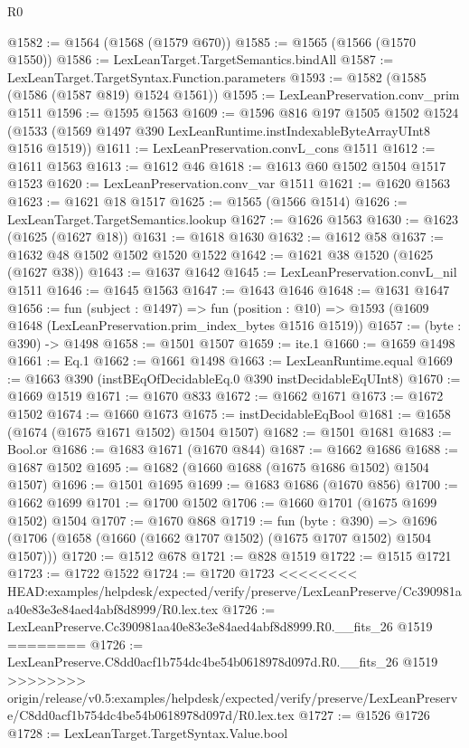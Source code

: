 \begin{lexlean}{R0}
\begin{coremodule}
{{{{{{{{{{{{{{{{{{{{{{{{{{{{{{{{{{{{{{{{{{{{{{{{{{{{{{{{{{{{{{{{{{{{{{{{{@1582 := @1564 (@1568 (@1579 @670))
@1585 := @1565 (@1566 (@1570 @1550))
@1586 := LexLeanTarget.TargetSemantics.bindAll
@1587 := LexLeanTarget.TargetSyntax.Function.parameters
@1593 := @1582 (@1585 (@1586 (@1587 @819) @1524 @1561))
@1595 := LexLeanPreservation.conv_prim @1511
@1596 := @1595 @1563
@1609 := @1596
    @816
    @197
    @1505
    @1502
    @1524
    (@1533 (@1569 @1497 @390 LexLeanRuntime.instIndexableByteArrayUInt8 @1516 @1519))
@1611 := LexLeanPreservation.convL_cons @1511
@1612 := @1611 @1563
@1613 := @1612 @46
@1618 := @1613 @60 @1502 @1504 @1517 @1523
@1620 := LexLeanPreservation.conv_var @1511
@1621 := @1620 @1563
@1623 := @1621 @18 @1517
@1625 := @1565 (@1566 @1514)
@1626 := LexLeanTarget.TargetSemantics.lookup
@1627 := @1626 @1563
@1630 := @1623 (@1625 (@1627 @18))
@1631 := @1618 @1630
@1632 := @1612 @58
@1637 := @1632 @48 @1502 @1502 @1520 @1522
@1642 := @1621 @38 @1520 (@1625 (@1627 @38))
@1643 := @1637 @1642
@1645 := LexLeanPreservation.convL_nil @1511
@1646 := @1645 @1563
@1647 := @1643 @1646
@1648 := @1631 @1647
@1656 := fun (subject : @1497) =>
  fun (position : @10) => @1593 (@1609 @1648 (LexLeanPreservation.prim_index_bytes @1516 @1519))
@1657 := (byte : @390) -> @1498
@1658 := @1501 @1507
@1659 := ite.{1}
@1660 := @1659 @1498
@1661 := Eq.{1}
@1662 := @1661 @1498
@1663 := LexLeanRuntime.equal
@1669 := @1663 @390 (instBEqOfDecidableEq.{0} @390 instDecidableEqUInt8)
@1670 := @1669 @1519
@1671 := @1670 @833
@1672 := @1662 @1671
@1673 := @1672 @1502
@1674 := @1660 @1673
@1675 := instDecidableEqBool
@1681 := @1658 (@1674 (@1675 @1671 @1502) @1504 @1507)
@1682 := @1501 @1681
@1683 := Bool.or
@1686 := @1683 @1671 (@1670 @844)
@1687 := @1662 @1686
@1688 := @1687 @1502
@1695 := @1682 (@1660 @1688 (@1675 @1686 @1502) @1504 @1507)
@1696 := @1501 @1695
@1699 := @1683 @1686 (@1670 @856)
@1700 := @1662 @1699
@1701 := @1700 @1502
@1706 := @1660 @1701 (@1675 @1699 @1502) @1504
@1707 := @1670 @868
@1719 := fun (byte : @390) =>
  @1696 (@1706 (@1658 (@1660 (@1662 @1707 @1502) (@1675 @1707 @1502) @1504 @1507)))
@1720 := @1512 @678
@1721 := @828 @1519
@1722 := @1515 @1721
@1723 := @1722 @1522
@1724 := @1720 @1723
<<<<<<<< HEAD:examples/helpdesk/expected/verify/preserve/LexLeanPreserve/Cc390981aa40e83e3e84aed4abf8d8999/R0.lex.tex
@1726 := LexLeanPreserve.Cc390981aa40e83e3e84aed4abf8d8999.R0.__fits_26 @1519
========
@1726 := LexLeanPreserve.C8dd0acf1b754dc4be54b0618978d097d.R0.__fits_26 @1519
>>>>>>>> origin/release/v0.5:examples/helpdesk/expected/verify/preserve/LexLeanPreserve/C8dd0acf1b754dc4be54b0618978d097d/R0.lex.tex
@1727 := @1526 @1726
@1728 := LexLeanTarget.TargetSyntax.Value.bool
}}}}}}}}}}}}}}}}}}}}}}}}}}}}}}}}}}}}}}}}}}}}}}}}}}}}}}}}}}}}}}}}}}}}}}}}}
\end{coremodule}
\end{lexlean}
